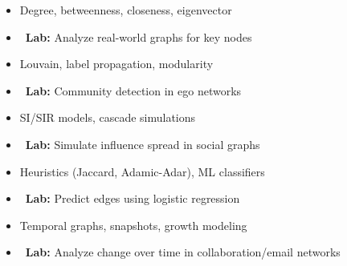 \documentclass[11pt,a4paper]{article}
\begin{document}
\begin{weekbox}[title={Week 8: Centrality Measures}]
\begin{itemize}
  \item Degree, betweenness, closeness, eigenvector
  \item \textcolor{accent}{\faFlask\ \textbf{Lab:}} Analyze real-world graphs for key nodes
\end{itemize}
\end{weekbox}

\begin{weekbox}[title={Week 9: Communities \& Subgraphs}]
\begin{itemize}
  \item Louvain, label propagation, modularity
  \item \textcolor{accent}{\faFlask\ \textbf{Lab:}} Community detection in ego networks
\end{itemize}
\end{weekbox}

\begin{weekbox}[title={Week 10: Network Diffusion}]
\begin{itemize}
  \item SI/SIR models, cascade simulations
  \item \textcolor{accent}{\faFlask\ \textbf{Lab:}} Simulate influence spread in social graphs
\end{itemize}
\end{weekbox}

\begin{weekbox}[title={Week 11: Link Prediction \& Node Classification}]
\begin{itemize}
  \item Heuristics (Jaccard, Adamic-Adar), ML classifiers
  \item \textcolor{accent}{\faFlask\ \textbf{Lab:}} Predict edges using logistic regression
\end{itemize}
\end{weekbox}

\begin{weekbox}[title={Week 12: Dynamic Networks}]
\begin{itemize}
  \item Temporal graphs, snapshots, growth modeling
  \item \textcolor{accent}{\faFlask\ \textbf{Lab:}} Analyze change over time in collaboration/email networks
\end{itemize}
\end{weekbox}
\end{document}
